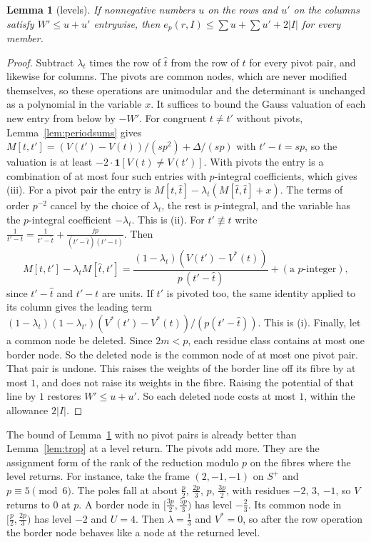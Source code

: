\documentclass[11pt]{amsart}
\newtheorem{lemma}[theorem]{Lemma}
\theoremstyle{definition}
\theoremstyle{remark}
\numberwithin{equation}{section}
\begin{document}
\begin{lemma}[levels]\label{lem:levels}
If nonnegative numbers $u$ on the rows and $u'$ on the columns satisfy $W'\le u+u'$ entrywise, then
$e_p(r,I)\le\sum u+\sum u'+2|I|$ for every member.
\end{lemma}
\begin{proof}
Subtract $\lambda_t$ times the row of $\hat t$ from the row of $t$ for every pivot pair, and likewise for columns. The
pivots are common nodes, which are never modified themselves, so these operations are unimodular and the determinant is
unchanged as a polynomial in the variable $x$. It suffices to bound the Gauss valuation of each new entry from below by
$-W'$. For congruent $t\ne t'$ without pivots, Lemma~\ref{lem:periodsums} gives
$M[t,t']=(V(t')-V(t))/(sp^2)+\Delta/(sp)$ with $t'-t=sp$, so the valuation is at least
$-2\cdot\mathbf 1[V(t)\ne V(t')]$. With pivots the entry is a combination of at most four such entries with
$p$-integral coefficients, which gives (iii). For a pivot pair the entry is $M[t,\hat t]-\lambda_t(M[\hat t,\hat t]+x)$.
The terms of order $p^{-2}$ cancel by the choice of $\lambda_t$, the rest is $p$-integral, and the variable has the
$p$-integral coefficient $-\lambda_t$. This is (ii). For $t'\not\equiv t$ write
$\frac1{t'-t}=\frac1{t'-\hat t}+\frac{jp}{(t'-\hat t)(t'-t)}$. Then
\[
 M[t,t']-\lambda_tM[\hat t,t']=\frac{(1-\lambda_t)(V(t')-V^*(t))}{p\,(t'-\hat t)}+(\text{a $p$-integer}),
\]
since $t'-\hat t$ and $t'-t$ are units. If $t'$ is pivoted too, the same identity applied to its column gives the leading
term $(1-\lambda_t)(1-\lambda_{t'})(V^*(t')-V^*(t))/(p(t'-\hat t))$. This is (i). Finally, let a common node be deleted.
Since $2m<p$, each residue class contains at most one border node. So the deleted node is the common node of at most one
pivot pair. That pair is undone. This raises the weights of the border line off its fibre by at most $1$, and does not
raise its weights in the fibre. Raising the potential of that line by $1$ restores $W'\le u+u'$. So each deleted node
costs at most $1$, within the allowance $2|I|$.
\end{proof}

The bound of Lemma~\ref{lem:levels} with no pivot pairs is already better than Lemma~\ref{lem:trop} at a level return.
The pivots add more. They are the assignment form of the rank of the reduction modulo $p$ on the fibres where the
level returns. For instance, take the frame $(2,-1,-1)$ on $S^+$ and $p\equiv5\pmod6$. The poles fall at about $\frac
p2$, $\frac{2p}3$, $p$, $\frac{3p}2$, with residues $-2$, $3$, $-1$, so $V$ returns to $0$ at $p$. A border node in
$[\frac{3p}2,\frac{5p}3)$ has level $-\frac23$. Its common node in $[\frac p2,\frac{2p}3)$ has level $-2$ and $U=4$. Then
$\lambda=\frac13$ and $V^*=0$, so after the row operation the border node behaves like a node at the returned level.
\end{document}

